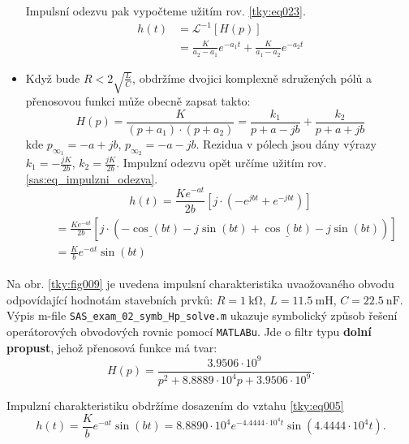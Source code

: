 \begin{mdframed}[style=mdexam]
\begin{example}
\begin{itemize}[leftmargin=12pt,noitemsep]
\begin{equation*}
            \end{equation*}
            Impulsní odezvu pak vypočteme užitím rov. \ref{tky:eq023}.
            \begin{align*}
              h(t)&=\mathcal{L}^{-1}[H(p)]               \\
                  &=\frac{K}{a_2-a_1}e^{-a_1t}+\frac{K}{a_1-a_2}e^{-a_2t}
            \end{align*}
      \item Když bude $R<2\sqrt{\frac{L}{C}}$, obdržíme dvojici komplexně sdružených pólů a
            přenosovou funkci může obecně zapsat takto:
            \begin{equation*}
              H(p)=\frac{K}{(p+a_1)\cdot(p+a_2)}=\frac{k_1}{p+a-jb}+\frac{k_2}{p+a+jb}
            \end{equation*}
            kde $p_{\infty_1}=-a+jb$, $p_{\infty_2}=-a-jb$. Rezidua v pólech jsou dány výrazy
            $k_1=-\frac{jK}{2b}$, $k_2=\frac{jK}{2b}$. Impulzní odezvu opět určíme užitím rov.
            \ref{sas:eq_impulzni_odezva}.
            \begin{equation*}
              h(t) = \frac{Ke^{-at}}{2b}\left[j\cdot\left(-e^{jbt}+e^{-jbt}\right)\right]
            \end{equation*}
            \begin{gather*}
              \begin{align*}
                \,  &= \frac{Ke^{-at}}{2b}\left[j\cdot
                \left(\underline{-\cos(bt)}-j\sin(bt)+
                \underline{\cos(bt)}-j\sin(bt)\right)\right]                        \\
                \,  &= \frac{K}{b}e^{-at}\sin(bt)                                   
              \end{align*}
            \end{gather*}
    \end{itemize}
    
    Na obr. \ref{tky:fig009} je uvedena impulsní charakteristika uvaožovaného obvodu odpovídající
    hodnotám stavebních prvků: \(R=\SI{1}{\kohm}\), \(L=\SI{11.5}{\milli\henry}\),
    \(C=\SI{22.5}{\nano\farad}\). Výpis m-file \texttt{SAS\_exam\_02\_symb\_Hp\_solve.m} ukazuje
    symbolický způsob řešení operátorových obvodových rovnic pomocí \texttt{MATLABu}. Jde o filtr
    typu \textbf{dolní propust}, jehož přenosová funkce má tvar:
    $$H(p)= \frac{3.9506\cdot10^9}{p^2+8.8889\cdot10^4p+3.9506\cdot10^9}.$$
      
    Impulzní charakteristiku obdržíme dosazením do vztahu \ref{tky:eq005}
    $$h(t)=\frac{K}{b}e^{-at}\sin(bt) =8.8890\cdot10^4e^{-4.4444\cdot10^4t}\sin(4.4444\cdot10^4t).$$
    

\end{example}
\end{mdframed}
